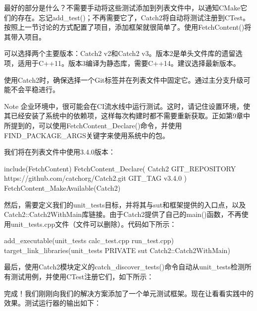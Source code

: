 最好的部分是什么？不需要手动将这些测试添加到列表文件中，以通知CMake它们的存在。忘记add\_test()；不再需要它了，Catch2将自动将测试注册到CTest。按照上一节讨论的方式配置了项目，添加框架就很简单了。使用FetchContent()将其带入项目。

可以选择两个主要版本：Catch2 v2和Catch2 v3。版本2是单头文件库的遗留选项，适用于C++11。版本3编译为静态库，需要C++14。建议选择最新版本。

使用Catch2时，确保选择一个Git标签并在列表文件中固定它。通过主分支升级可能不会平稳进行。

\begin{myNotic}{Note}
企业环境中，很可能会在CI流水线中运行测试。这时，请记住设置环境，使其已经安装了系统中的依赖项，这样每次构建时都不需要重新获取。正如第9章中所提到的，可以使用FetchContent\_Declare()命令，并使用FIND\_PACKAGE\_ARGS关键字来使用系统中的包。
\end{myNotic}

我们将在列表文件中使用3.4.0版本：


\begin{cmake}
include(FetchContent)
FetchContent_Declare(
    Catch2
    GIT_REPOSITORY https://github.com/catchorg/Catch2.git
    GIT_TAG v3.4.0
)
FetchContent_MakeAvailable(Catch2)
\end{cmake}

然后，需要定义我们的unit\_tests目标，并将其与sut和框架提供的入口点，以及Catch2::Catch2WithMain库链接。由于Catch2提供了自己的main()函数，不再使用unit\_tests.cpp文件（文件可以删除）。代码如下所示：


\begin{cmake}
add_executable(unit_tests calc_test.cpp run_test.cpp)
target_link_libraries(unit_tests PRIVATE
                      sut Catch2::Catch2WithMain)
\end{cmake}

最后，使用Catch2模块定义的catch\_discover\_tests()命令自动从unit\_tests检测所有测试用例，并使用CTest注册它们，如下所示：



完成！我们刚刚向我们的解决方案添加了一个单元测试框架。现在让看看实践中的效果。测试运行器的输出如下：

